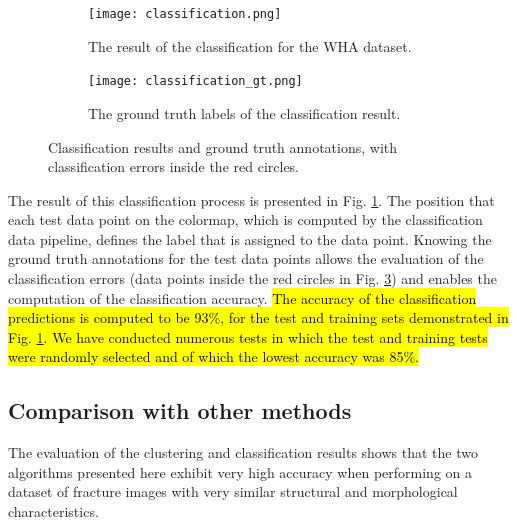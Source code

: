 \documentclass[authoryear,preprint,review,12pt, singleside]{elsarticle}
\begin{document}
\begin{figure}[!h]
	\centering
	\begin{subfigure}[b]{0.49\textwidth}
		\centering
		\texttt{[image: classification.png]}
		\caption{The result of the classification for the WHA dataset.}
		\label{fig:classification}
	\end{subfigure}
	\begin{subfigure}[b]{0.49\textwidth}
		\centering
		\texttt{[image: classification\_gt.png]}
		\caption{The ground truth labels of the classification result.}
		\label{fig:classification_gt}
	\end{subfigure}
	\caption{Classification results and ground truth annotations, with classification errors inside the red circles.}
\end{figure}

The result of this classification process is presented in Fig. \ref{fig:classification}. The position that each test data point on the colormap, which is computed by the classification data pipeline, defines the label that is assigned to the data point. Knowing the ground truth annotations for the test data points allows the evaluation of the classification errors (data points inside the red circles in Fig. \ref{fig:classification_gt}) and enables the computation of the classification accuracy. \hl{The accuracy of the classification predictions is computed to be 93\%, for the test and training sets demonstrated in Fig. \ref{fig:classification}. We have conducted numerous tests in which the test and training tests were randomly selected and of which the lowest accuracy was 85\%.} 

   


\subsection{Comparison with other methods}

The evaluation of the clustering and classification results shows that the two algorithms presented here exhibit very high accuracy when performing on a dataset of fracture images with very similar structural and morphological characteristics. 
\end{document}
